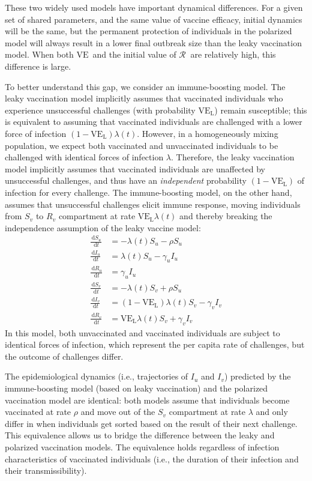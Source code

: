 \documentclass[12pt]{article}
\newcommand{\Rx}[1]{\ensuremath{{\mathcal R}_{#1}}\xspace}
\newcommand{\dd}[1]{\ensuremath{\, \mathrm{d}#1}}
\newcommand{\VE}{\ensuremath{\mathrm{VE}}}
\newcommand{\VEL}{\ensuremath{\VE_{\mathrm{L}}}}
\begin{document}
These two widely used models have important dynamical differences. For a given set of shared parameters, and the same value of vaccine efficacy, initial dynamics will be the same, but the permanent protection of individuals in the polarized model will always result in a lower final outbreak size than the leaky vaccination model. When both \VE\ and the initial value of \Rx\ are relatively high, this difference is large.

To better understand this gap, we consider an immune-boosting model.
The leaky vaccination model implicitly assumes that vaccinated individuals who experience unsuccessful challenges (with probability $\VEL$) remain susceptible;
this is equivalent to assuming that vaccinated individuals are challenged with a lower force of infection $(1-\VEL) \lambda(t)$.
However, in a homogeneously mixing population, we expect both vaccinated and unvaccinated individuals to be challenged with identical forces of infection $\lambda$.
Therefore, the leaky vaccination model implicitly assumes that vaccinated individuals are unaffected by unsuccessful challenges, and thus have an \emph{independent} probability $(1-\VEL)$ of infection for every challenge. The immune-boosting model, on the other hand, assumes that unsuccessful challenges elicit immune response, moving individuals from $S_v$ to $R_v$ compartment at rate $\VEL \lambda(t)$ and thereby breaking the independence assumption of the leaky vaccine model:  
\begin{align}
\frac{\dd S_u}{\dd t} &= - \lambda(t) S_u - \rho S_u \\
\frac{\dd I_u}{\dd t} &= \lambda(t) S_u - \gamma_u I_u \\
\frac{\dd R_u}{\dd t} &= \gamma_u I_u \\
\frac{\dd S_v}{\dd t} &= - \lambda(t) S_v + \rho S_u \\
\frac{\dd I_v}{\dd t} &= (1-\VEL) \lambda(t) S_v - \gamma_v I_v \\
\frac{\dd R_v}{\dd t} &= \VEL \lambda(t) S_v + \gamma_v I_v
\end{align}
In this model, both unvaccinated and vaccinated individuals are subject to identical forces of infection, which represent the per capita rate of challenges, but the outcome of challenges differ.

The epidemiological dynamics (i.e., trajectories of $I_u$ and $I_v$) predicted by the immune-boosting model (based on leaky vaccination) and the polarized vaccination model are identical: 
both models assume that individuals become vaccinated at rate $\rho$ and move out of the $S_v$ compartment at rate $\lambda$ and only differ in when individuals get sorted based on the result of their next challenge.
This equivalence allows us to bridge the difference between the leaky and polarized vaccination models.
The equivalence holds regardless of infection characteristics of vaccinated individuals (i.e., the duration of their infection and their transmissibility).
\end{document}
